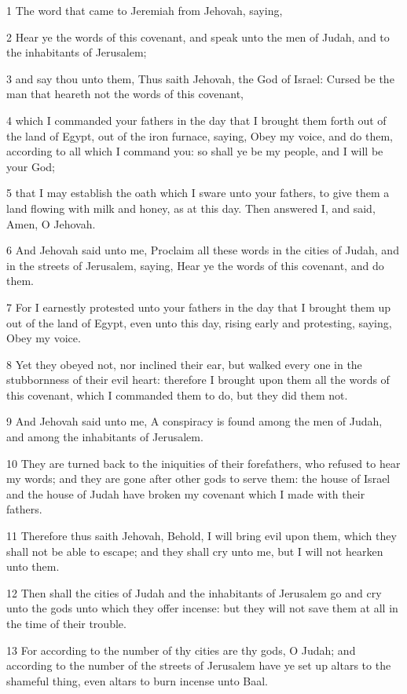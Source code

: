 \par 1 The word that came to Jeremiah from Jehovah, saying,
\par 2 Hear ye the words of this covenant, and speak unto the men of Judah, and to the inhabitants of Jerusalem;
\par 3 and say thou unto them, Thus saith Jehovah, the God of Israel: Cursed be the man that heareth not the words of this covenant,
\par 4 which I commanded your fathers in the day that I brought them forth out of the land of Egypt, out of the iron furnace, saying, Obey my voice, and do them, according to all which I command you: so shall ye be my people, and I will be your God;
\par 5 that I may establish the oath which I sware unto your fathers, to give them a land flowing with milk and honey, as at this day. Then answered I, and said, Amen, O Jehovah.
\par 6 And Jehovah said unto me, Proclaim all these words in the cities of Judah, and in the streets of Jerusalem, saying, Hear ye the words of this covenant, and do them.
\par 7 For I earnestly protested unto your fathers in the day that I brought them up out of the land of Egypt, even unto this day, rising early and protesting, saying, Obey my voice.
\par 8 Yet they obeyed not, nor inclined their ear, but walked every one in the stubbornness of their evil heart: therefore I brought upon them all the words of this covenant, which I commanded them to do, but they did them not.
\par 9 And Jehovah said unto me, A conspiracy is found among the men of Judah, and among the inhabitants of Jerusalem.
\par 10 They are turned back to the iniquities of their forefathers, who refused to hear my words; and they are gone after other gods to serve them: the house of Israel and the house of Judah have broken my covenant which I made with their fathers.
\par 11 Therefore thus saith Jehovah, Behold, I will bring evil upon them, which they shall not be able to escape; and they shall cry unto me, but I will not hearken unto them.
\par 12 Then shall the cities of Judah and the inhabitants of Jerusalem go and cry unto the gods unto which they offer incense: but they will not save them at all in the time of their trouble.
\par 13 For according to the number of thy cities are thy gods, O Judah; and according to the number of the streets of Jerusalem have ye set up altars to the shameful thing, even altars to burn incense unto Baal.
